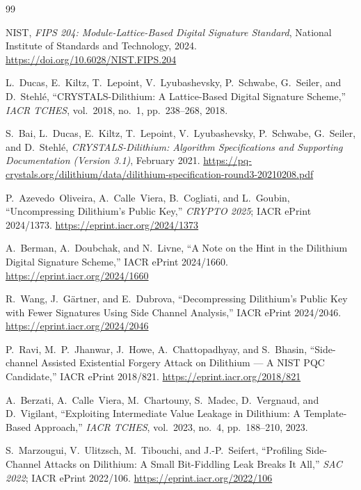 \documentclass{article}
\begin{document}
\begingroup\sloppy{}
\begin{thebibliography}{99}

NIST, \emph{FIPS 204: Module-Lattice-Based Digital Signature Standard},
National Institute of Standards and Technology, 2024.
\url{https://doi.org/10.6028/NIST.FIPS.204}

L.~Ducas, E.~Kiltz, T.~Lepoint, V.~Lyubashevsky, P.~Schwabe,
G.~Seiler, and D.~Stehl\'e,
``CRYSTALS-Dilithium: A Lattice-Based Digital Signature Scheme,''
\emph{IACR TCHES}, vol.~2018, no.~1, pp.~238--268, 2018.

S.~Bai, L.~Ducas, E.~Kiltz, T.~Lepoint, V.~Lyubashevsky, P.~Schwabe,
G.~Seiler, and D.~Stehl\'e,
\emph{CRYSTALS-Dilithium: Algorithm Specifications and Supporting
Documentation (Version 3.1)}, February 2021.
\url{https://pq-crystals.org/dilithium/data/dilithium-specification-round3-20210208.pdf}

P.~Azevedo~Oliveira, A.~Calle~Viera, B.~Cogliati, and L.~Goubin,
``Uncompressing Dilithium's Public Key,''
\emph{CRYPTO 2025}; IACR ePrint 2024/1373.
\url{https://eprint.iacr.org/2024/1373}

A.~Berman, A.~Doubchak, and N.~Livne,
``A Note on the Hint in the Dilithium Digital Signature Scheme,''
IACR ePrint 2024/1660.
\url{https://eprint.iacr.org/2024/1660}

R.~Wang, J.~G\"artner, and E.~Dubrova,
``Decompressing Dilithium's Public Key with Fewer Signatures Using Side
Channel Analysis,''
IACR ePrint 2024/2046.
\url{https://eprint.iacr.org/2024/2046}

P.~Ravi, M.~P.~Jhanwar, J.~Howe, A.~Chattopadhyay, and S.~Bhasin,
``Side-channel Assisted Existential Forgery Attack on Dilithium --- A NIST PQC
Candidate,''
IACR ePrint 2018/821.
\url{https://eprint.iacr.org/2018/821}

A.~Berzati, A.~Calle~Viera, M.~Chartouny, S.~Madec, D.~Vergnaud, and D.~Vigilant,
``Exploiting Intermediate Value Leakage in Dilithium: A Template-Based Approach,''
\emph{IACR TCHES}, vol.~2023, no.~4, pp.~188--210, 2023.

S.~Marzougui, V.~Ulitzsch, M.~Tibouchi, and J.-P.~Seifert,
``Profiling Side-Channel Attacks on Dilithium: A Small Bit-Fiddling Leak
Breaks It All,''
\emph{SAC 2022}; IACR ePrint 2022/106.
\url{https://eprint.iacr.org/2022/106}


\end{thebibliography}
\end{document}
